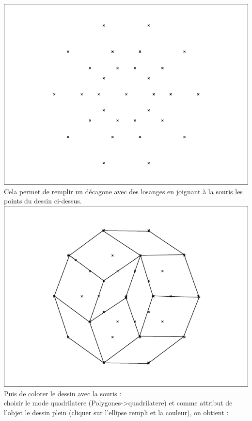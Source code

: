\documentclass[a4paper,11pt]{book}
\begin{document}
\includegraphics[width=\textwidth]{deca}\\
Cela permet de remplir un d\'ecagone avec des losanges en joignant \`a la souris
les points du dessin ci-dessus.\\
\includegraphics[width=\textwidth]{decas}\\
Puis de colorer le dessin avec la souris :\\
choisir le mode quadrilatere (Polygones->quadrilatere) et comme attribut de 
l'objet le dessin plein (cliquer sur l'ellipse rempli et la couleur), 
on obtient :\\
\end{document}
